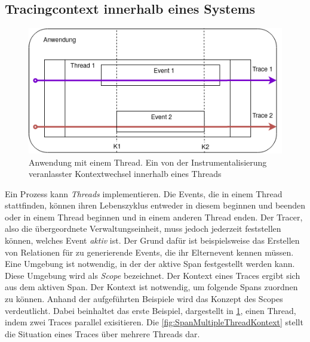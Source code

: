 \subsection{Tracingcontext innerhalb eines Systems}
\label{subsection:Tracingcontext innerhalb eines Systems}

\begin{figure}[!ht]
	\centering
	\includegraphics[scale=0.5]{img/Design/SpanThreadKontext.png}
	\caption[Tracingkontexts in einem Threads innerhalb einer Anwendung]{Anwendung mit einem Thread. Ein von der Instrumentalisierung veranlasster Kontextwechsel innerhalb eines Threads}
	\label{fig:SpanThreadKontext}
\end{figure}


Ein Prozess kann \emph{Threads} implementieren. Die Events, die in einem Thread stattfinden, können ihren Lebenszyklus entweder in diesem beginnen und beenden oder in einem Thread beginnen und in einem anderen Thread enden. Der Tracer, also die übergeordnete Verwaltungseinheit, muss jedoch jederzeit feststellen können, welches Event \emph{aktiv} ist. Der Grund dafür ist beispielsweise das Erstellen von Relationen für zu generierende Events, die ihr Elternevent kennen müssen. Eine Umgebung ist notwendig, in der der aktive Span festgestellt werden kann. Diese Umgebung wird als \emph{Scope} bezeichnet. Der Kontext eines Traces ergibt sich aus dem aktiven Span. Der Kontext ist notwendig, um folgende Spans zuordnen zu können. Anhand der aufgeführten Beispiele wird das Konzept des Scopes verdeutlicht. Dabei beinhaltet das erste Beispiel, dargestellt in \cref{fig:SpanThreadKontext}, einen Thread, indem zwei Traces parallel exisitieren. Die \cref{fig:SpanMultipleThreadKontext} stellt die Situation eines Traces über mehrere Threads dar.

